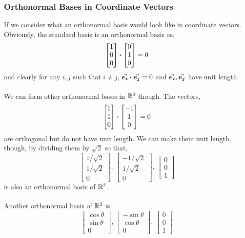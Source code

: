 \documentclass[../MathsNotesBase.tex]{subfiles}
\begin{document}
{		\subsubsection{Orthonormal Bases in Coordinate Vectors} 
		If we consider what an orthonormal basis would look like in coordinate vectors. Obviously, the standard basis is an orthonormal basis as,
			\[ \begin{bmatrix}1\\0\\0\end{bmatrix} \boldsymbol{\cdot} \begin{bmatrix}0\\1\\0\end{bmatrix} = 0 \]
			and clearly for any ${ i,j }$ such that ${ i \neq j }$, ${ \vec{\bm{e_i}} \boldsymbol{\cdot} \vec{\bm{e_j}} = 0 }$ and ${\vec{\bm{e_i}}, \vec{\bm{e_j}} }$ have unit length.\\\\
			We can form other orthonormal bases in $\mathbb{R}^{3}$ though. The vectors,
			\[ \begin{bmatrix}1\\1\\0\end{bmatrix} \boldsymbol{\cdot} \begin{bmatrix}-1\\1\\0\end{bmatrix} = 0 \]
			are orthogonal but do not have unit length. We can make them unit length, though, by dividing them by $\sqrt{2}$ so that,
			\[ \begin{bmatrix}1/\sqrt{2}\\1/\sqrt{2}\\0\end{bmatrix},\, \begin{bmatrix}-1/\sqrt{2}\\1/\sqrt{2}\\0\end{bmatrix},\, \begin{bmatrix}0\\0\\1\end{bmatrix} \]
			is also an orthonormal basis of $\mathbb{R}^{3}$.\\\\
			Another orthonormal basis of $\mathbb{R}^{3}$ is
			\[ \begin{bmatrix}\cos\theta\\\sin\theta\\0\end{bmatrix},\, \begin{bmatrix}-\sin\theta\\\cos\theta\\0\end{bmatrix},\, \begin{bmatrix}0\\0\\1\end{bmatrix} \]
}
\end{document}
